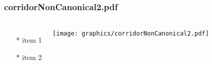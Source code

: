 \begin{frame} \frametitle{corridorNonCanonical2.pdf}
    \begin{columns}[c]
        \begin{itemize}
            \item[*] item 1
            \item[*] item 2
        \end{itemize}
        \begin{minipage}{\linewidth}
            \begin{center}
            \texttt{[image: graphics/corridorNonCanonical2.pdf]}
            \label{gfx:corridorNonCanonical2.pdf}
            \end{center}
        \end{minipage}
    \end{columns}
\end{frame}
